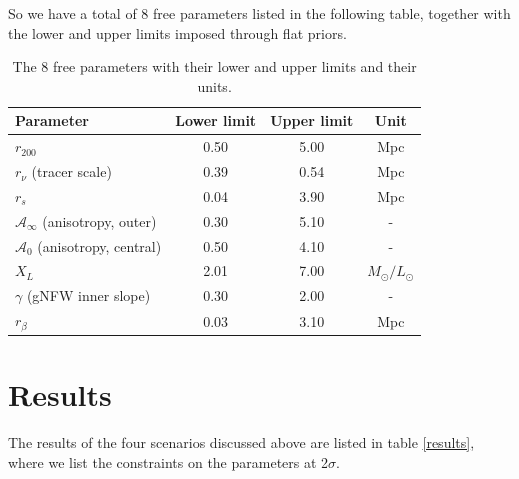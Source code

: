 So we have a total of 8 free parameters listed in the following table, together with the lower and upper limits imposed through flat priors.
\begin{table}[h!]
    \centering
    \begin{tabular}{@{}lccc@{}}
        \toprule
        \textbf{Parameter} & \textbf{Lower limit} & \textbf{Upper limit} & \textbf{Unit}\\
        \midrule
        $r_{200}$                      & 0.50 & 5.00 & Mpc\\
        $r_{\nu}$ (tracer scale)           & 0.39 & 0.54 & Mpc\\
        $r_{s}$                      & 0.04 & 3.90 & Mpc\\
        $\mathcal{A}_\infty$ (anisotropy, outer)  & 0.30 & 5.10 & -\\
        $\mathcal{A}_0$ (anisotropy, central)     & 0.50 & 4.10 & -\\
        $X_L$      & 2.01 & 7.00 & $M_\odot/L_\odot$\\
        $\gamma$ (gNFW inner slope)               & 0.30 & 2.00 & -\\
        $r_{\beta}$                         & 0.03 & 3.10 & Mpc\\
        \bottomrule
    \end{tabular}
    \caption[Free parameters and relative bounds for \textsc{MG-MAMPOSSt} analysis]{The 8 free parameters with their lower and upper limits and their units.}
    \label{tab:8 free parameter in gT with beta free run}
\end{table}


\section{Results}

The results of the four scenarios discussed above are listed in table \ref{results}, where we list the constraints on the parameters at 2$\sigma$.


